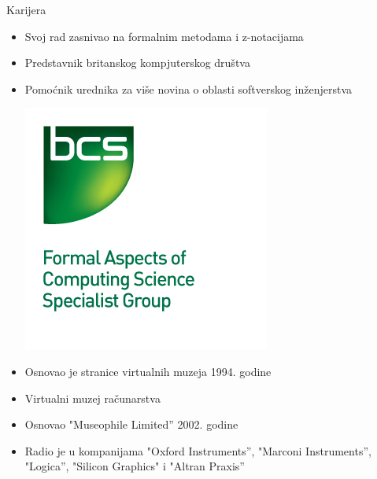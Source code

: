 \documentclass{beamer}
\begin{document}
\begin{frame}{Karijera}

    \begin{itemize}

        \item Svoj rad zasnivao na formalnim metodama i z-notacijama

        \item Predstavnik britanskog kompjuterskog društva

        \item Pomoćnik urednika za više novina o oblasti softverskog inženjerstva

	\begin{left} \includegraphics[scale=2]{BCS-FACS_logo.jpg} \end{left}

    \end{itemize}

\end{frame}



\begin{frame}

\begin{itemize}

		\item Osnovao je stranice virtualnih muzeja 1994. godine

		\item Virtualni muzej računarstva 

		\item Osnovao "Museophile Limited” 2002. godine

		\item  Radio je u kompanijama "Oxford Instruments”, "Marconi Instruments”, "Logica”, "Silicon Graphics" i "Altran Praxis”

		    \end{itemize}

\end{frame}
\end{document}

